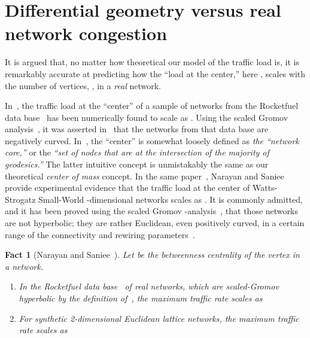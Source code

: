 \documentclass{article}
\newtheorem{fact}{Fact}
\begin{document}
\noindent 

\noindent 
\section{Differential geometry versus real network congestion}
\label{s:real_networks}

It is argued that, no matter how theoretical our model  of the traffic load is, 
it is remarkably accurate at predicting how the ``load at the center,'' here , scales with the number of vertices, , 
in a \textit{real} network. 

In~\cite{arXiv_dmitri}, 
the traffic load at the ``center'' of a sample of networks from the Rocketfuel data base~\cite{rocketfuel} 
has been numerically found to scale as . 
Using the scaled Gromov analysis~\cite{scaled_gromov}, 
it was asserted in~\cite{arXiv_dmitri} that the networks from that data base are negatively curved. 
In~\cite{arXiv_dmitri}, the ``center'' is somewhat loosely defined as \textit{the ``network core,''} 
or the \textit{``set of nodes that are at the intersection of the majority of geodesics.''}  
The latter intuitive concept is unmistakably the same as our theoretical \textit{center of mass} concept. 
In the same paper~\cite{arXiv_dmitri}, Narayan and Saniee provide experimental evidence that the traffic load at the center of Watts-Strogatz Small-World -dimensional networks scales as . It is commonly admitted, and it has been proved using the scaled Gromov -analysis~\cite{scaled_gromov}, that those networks are not hyperbolic; they are rather Euclidean, even positively curved, in a certain range of the connectivity and rewiring parameters~\cite[Sec. 6.4.2]{Matt_thesis}.

\begin{fact}[Narayan and Saniee~\cite{arXiv_dmitri}]
\label{fact:experimental}
Let  be the betweenness centrality of the vertex  in a network. 
\begin{enumerate}
\item In the Rocketfuel data base~\cite{rocketfuel} of real networks, 
which are scaled-Gromov hyperbolic by the definition of~\cite{scaled_gromov}, 
the maximum traffic rate scales as 

\item For synthetic 2-dimensional Euclidean lattice networks,  
the  maximum traffic rate scales as

\end{enumerate}
\end{fact}
\end{document}
